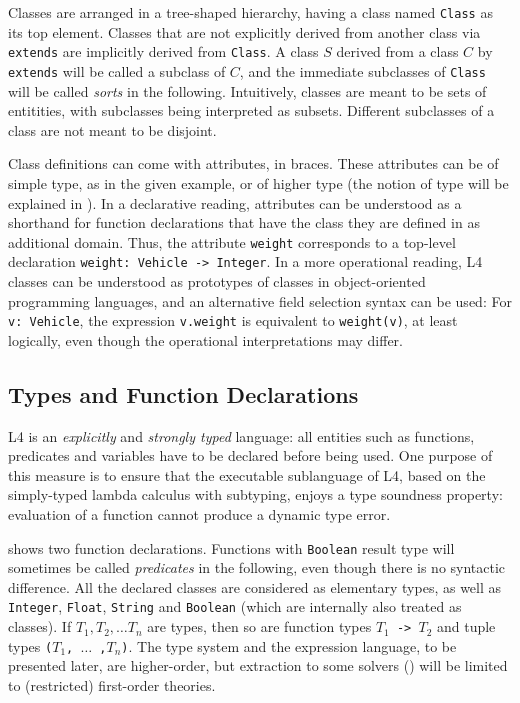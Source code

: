 Classes are arranged in a tree-shaped hierarchy, having a class named
\texttt{Class} as its top element. Classes that are not explicitly derived
from another class via \texttt{extends} are implicitly derived from
\texttt{Class}. A class $S$ derived from a class $C$ by \texttt{extends} will
be called a subclass of $C$, and the immediate subclasses of \texttt{Class}
will be called \emph{sorts} in the following. Intuitively, classes are meant
to be sets of entitities, with subclasses being interpreted as
subsets. Different subclasses of a class are not meant to be disjoint.

Class definitions can come with attributes, in braces. These attributes can be
of simple type, as in the given example, or of higher type (the notion of type
will be explained in ). In a declarative reading,
attributes can be understood as a shorthand for function declarations that
have the class they are defined in as additional domain. Thus, the attribute
\texttt{weight} corresponds to a top-level declaration \texttt{weight: Vehicle
  -> Integer}. In a more operational reading, L4 classes can be understood as
prototypes of classes in object-oriented programming languages, and an
alternative field selection syntax can be used: For \texttt{v: Vehicle}, the
expression \texttt{v.weight} is equivalent to \texttt{weight(v)}, at least
logically, even though the operational interpretations may differ.


\subsection{Types and Function Declarations}\label{sec:fundecls}

L4 is an \emph{explicitly} and \emph{strongly typed} language: all entities
such as functions, predicates and variables have to be declared before being
used. One purpose of this measure is to ensure that the executable sublanguage
of L4, based on the simply-typed lambda calculus with subtyping, enjoys a type
soundness property: evaluation of a function cannot produce a dynamic type
error.

 shows two function declarations. Functions with
\texttt{Boolean} result type will sometimes be called \emph{predicates} in the
following, even though there is no syntactic difference. All the declared
classes are considered as elementary types, as well as \texttt{Integer},
\texttt{Float}, \texttt{String} and \texttt{Boolean} (which are internally also treated as
classes). If $T_1, T_2, \dots T_n$ are types, then so are function types
\texttt{$T_1$ -> $T_2$} and tuple types \texttt{($T_1$, $\dots$ ,$T_n$)}. The
type system and the expression language, to be presented later, are
higher-order, but extraction to some solvers (\secref{}) will be limited to
(restricted) first-order theories.

